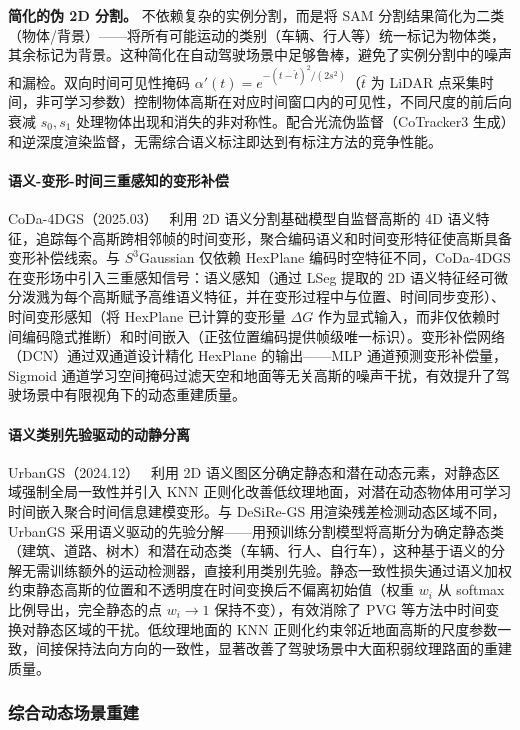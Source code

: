 \textbf{简化的伪 2D 分割。} 不依赖复杂的实例分割，而是将 SAM 分割结果简化为二类（物体/背景）——将所有可能运动的类别（车辆、行人等）统一标记为物体类，其余标记为背景。这种简化在自动驾驶场景中足够鲁棒，避免了实例分割中的噪声和漏检。双向时间可见性掩码 $\alpha'(t) = e^{-(t-\hat{t})^2 / (2s^2)}$（$\hat{t}$ 为 LiDAR 点采集时间，非可学习参数）控制物体高斯在对应时间窗口内的可见性，不同尺度的前后向衰减 $s_0, s_1$ 处理物体出现和消失的非对称性。配合光流伪监督（CoTracker3 生成）和逆深度渲染监督，无需综合语义标注即达到有标注方法的竞争性能。

\paragraph{语义-变形-时间三重感知的变形补偿}

CoDa-4DGS（2025.03）~\cite{2503_06744} 利用 2D 语义分割基础模型自监督高斯的 4D 语义特征，追踪每个高斯跨相邻帧的时间变形，聚合编码语义和时间变形特征使高斯具备变形补偿线索。与 $S^3$Gaussian 仅依赖 HexPlane 编码时空特征不同，CoDa-4DGS 在变形场中引入三重感知信号：语义感知（通过 LSeg 提取的 2D 语义特征经可微分泼溅为每个高斯赋予高维语义特征，并在变形过程中与位置、时间同步变形）、时间变形感知（将 HexPlane 已计算的变形量 $\Delta G$ 作为显式输入，而非仅依赖时间编码隐式推断）和时间嵌入（正弦位置编码提供帧级唯一标识）。变形补偿网络（DCN）通过双通道设计精化 HexPlane 的输出——MLP 通道预测变形补偿量，Sigmoid 通道学习空间掩码过滤天空和地面等无关高斯的噪声干扰，有效提升了驾驶场景中有限视角下的动态重建质量。

\paragraph{语义类别先验驱动的动静分离}

UrbanGS（2024.12）~\cite{2412_03473} 利用 2D 语义图区分确定静态和潜在动态元素，对静态区域强制全局一致性并引入 KNN 正则化改善低纹理地面，对潜在动态物体用可学习时间嵌入聚合时间信息建模变形。与 DeSiRe-GS 用渲染残差检测动态区域不同，UrbanGS 采用语义驱动的先验分解——用预训练分割模型将高斯分为确定静态类（建筑、道路、树木）和潜在动态类（车辆、行人、自行车），这种基于语义的分解无需训练额外的运动检测器，直接利用类别先验。静态一致性损失通过语义加权约束静态高斯的位置和不透明度在时间变换后不偏离初始值（权重 $w_i$ 从 softmax 比例导出，完全静态的点 $w_i \to 1$ 保持不变），有效消除了 PVG 等方法中时间变换对静态区域的干扰。低纹理地面的 KNN 正则化约束邻近地面高斯的尺度参数一致，间接保持法向方向的一致性，显著改善了驾驶场景中大面积弱纹理路面的重建质量。

\subsubsection{综合动态场景重建}

